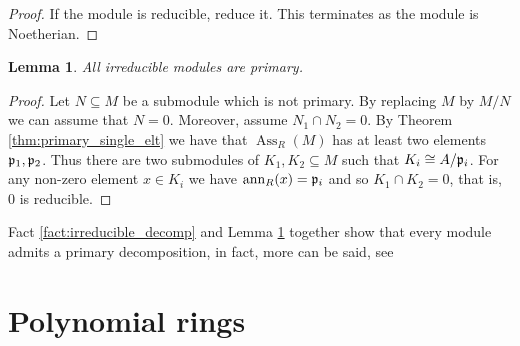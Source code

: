 \documentclass[12pt]{article}
\theoremstyle{plain}
\newtheorem{lemma}[thm]{Lemma}
\theoremstyle{definition}
\begin{document}
\begin{proof}
If the module is reducible, reduce it. This terminates as the module is Noetherian.
\end{proof}
\begin{lemma}
\label{lem:irred_primary} All irreducible modules are primary.
\end{lemma}
\begin{proof}
Let $N \subseteq M$ be a submodule which is not primary. By replacing $M$ by $M/N$ we can assume that $N = 0$. Moreover, assume $N_1 \cap N_2 = 0$. By Theorem \ref{thm:primary_single_elt} we have that $\operatorname{Ass}_R(M)$ has at least two elements $\frak{p}_1,\frak{p}_2$. Thus there are two submodules of $K_1,K_2 \subseteq M$ such that $K_i \cong A/\frak{p}_i$. For any non-zero element $x \in K_i$ we have $\operatorname{ann}_R(x) = \frak{p}_i$ and so $K_1 \cap K_2 = 0$, that is, $0$ is reducible.
\end{proof}
Fact \ref{fact:irreducible_decomp} and Lemma \ref{lem:irred_primary} together show that every module admits a primary decomposition, in fact, more can be said, see \cite[\S 2.6 Thm 6.8]{matsumura}
%
\section{Polynomial rings}
\end{document}
